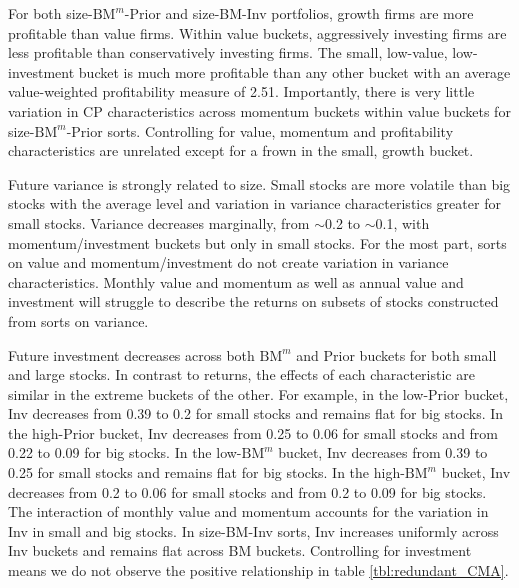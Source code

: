 For both size-$\text{BM}^m$-Prior and size-BM-Inv portfolios,
growth firms are more profitable than value firms.
Within value buckets, aggressively investing firms are less profitable than
conservatively investing firms.
The small, low-value, low-investment bucket is much more profitable than any
other bucket with an average value-weighted profitability measure of 2.51.
Importantly, there is very little variation in CP characteristics across
momentum buckets within value buckets for size-$\text{BM}^m$-Prior sorts.
Controlling for value, momentum and profitability characteristics are unrelated
except for a frown in the small, growth bucket.

Future variance is strongly related to size. Small stocks are more volatile
than big stocks with the average level and variation in variance
characteristics greater for small stocks. Variance decreases marginally, from
$\sim$0.2 to $\sim$0.1, with momentum/investment buckets but only in small
stocks. For the most part, sorts on value and momentum/investment do not create
variation in variance characteristics. Monthly value and momentum as well as
annual value and investment will struggle to describe the returns on subsets of
stocks constructed from sorts on variance.

Future investment decreases across both $\text{BM}^m$ and Prior buckets for
both small and large stocks. In contrast to returns, the effects of each
characteristic are similar in the extreme buckets of the other. For example, in
the low-Prior bucket, Inv decreases from 0.39 to 0.2 for small stocks and
remains flat for big stocks. In the high-Prior bucket, Inv decreases from 0.25
to 0.06 for small stocks and from 0.22 to 0.09 for big stocks. In the
low-$\text{BM}^m$ bucket, Inv decreases from 0.39 to 0.25 for small stocks and
remains flat for big stocks. In the high-$\text{BM}^m$ bucket, Inv decreases
from 0.2 to 0.06 for small stocks and from 0.2 to 0.09 for big stocks. The
interaction of monthly value and momentum accounts for the variation in Inv in
small and big stocks. In size-BM-Inv sorts, Inv increases uniformly across Inv
buckets and remains flat across BM buckets. Controlling for investment means we
do not observe the positive relationship in table \ref{tbl:redundant_CMA}.

